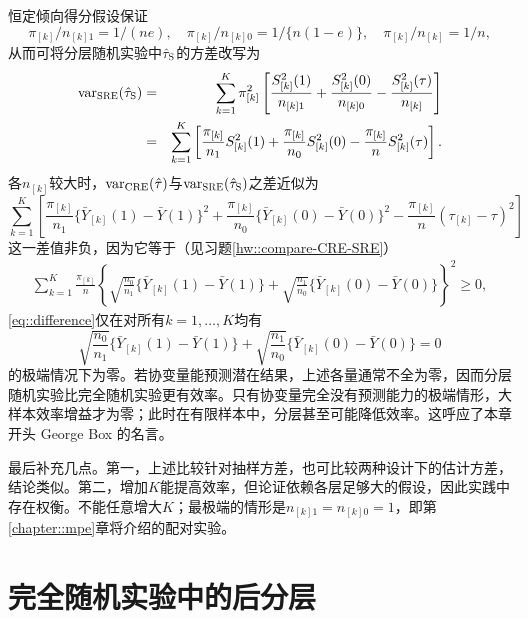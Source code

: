 恒定倾向得分假设保证
$$ 
\pi_{[k]} / n_{[k]1}  = 1/(ne), \quad   \pi_{[k]} / n_{[k]0} = 1/\{n(1-e) \},\quad \pi_{[k]} / n_{[k]} = 1/n,
$$
从而可将分层随机实验中$\hat{\tau}_\textsc{S}$的方差改写为
\begin{eqnarray*}
\textup{var}_\textsc{SRE}(\hat{\tau}_\textsc{S}) &= & \sum_{k=1}^K  \pi_{[k]}^2 \left[ \frac{S_{[k]}^2(1)}{ n_{[k]1} } +  \frac{S_{[k]}^2(0)}{ n_{[k]0} }
- \frac{  S_{[k]}^2(\tau) }{ n_{[k]} } \right]\\
&=&\sum_{k=1}^K  \left[   \frac{ \pi_{[k]}}{n_1}  S_{[k]}^2(1) + \frac{ \pi_{[k]}}{n_0}  S_{[k]}^2(0) -  \frac{ \pi_{[k]}}{n}    S_{[k]}^2(\tau) \right] .
\end{eqnarray*}
各$n_{[k]}$较大时，$\textup{var}_{\text{CRE}}(  \hat{\tau} )$与$\textup{var}_\textsc{SRE}(\hat{\tau}_\textsc{S})$之差近似为
$$
\sum_{k=1}^K  \left[    \frac{ \pi_{[k]}}{n_1}  \{ \bar{Y}_{[k]}(1) - \bar{Y}(1) \}^2 +  \frac{ \pi_{[k]}}{n_0}  \{ \bar{Y}_{[k]}(0) - \bar{Y}(0) \}^2  
 - \frac{  \pi_{[k]}  }{n}  ( \tau_{[k]} - \tau  ) ^2  \right] 
 $$
这一差值非负，因为它等于（见习题\ref{hw::compare-CRE-SRE}）
\begin{eqnarray}
\label{eq::difference}
\sum_{k=1}^K\frac{ \pi_{[k]}}{n} 
 \left\{
\sqrt{ \frac{n_0}{n_1} } \{ \bar{Y}_{[k]}(1) - \bar{Y}(1) \} +  \sqrt{ \frac{n_1}{n_0} } \{ \bar{Y}_{[k]}(0) - \bar{Y}(0) \}
 \right\}^2 \geq 0,
\end{eqnarray}
\eqref{eq::difference}仅在对所有$k=1,\ldots, K$均有
$$
\sqrt{ \frac{n_0}{n_1} } \{ \bar{Y}_{[k]}(1) - \bar{Y}(1) \} +  \sqrt{ \frac{n_1}{n_0} } \{ \bar{Y}_{[k]}(0) - \bar{Y}(0) \}
= 0 
$$
的极端情况下为零。若协变量能预测潜在结果，上述各量通常不全为零，因而分层随机实验比完全随机实验更有效率。只有协变量完全没有预测能力的极端情形，大样本效率增益才为零；此时在有限样本中，分层甚至可能降低效率。这呼应了本章开头 George Box 的名言。 

 


最后补充几点。第一，上述比较针对抽样方差，也可比较两种设计下的估计方差，结论类似。第二，增加$K$能提高效率，但论证依赖各层足够大的假设，因此实践中存在权衡。不能任意增大$K$；最极端的情形是$n_{[k]1} = n_{[k]0} = 1$，即第\ref{chapter::mpe}章将介绍的配对实验。 

 




\section{完全随机实验中的后分层}\label{sec::poststra-cre}

